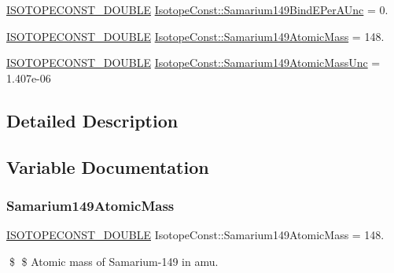 \begin{DoxyCompactItemize}
\mbox{\hyperlink{group___isotope_const-_macros_ga8f45a7272ce02c0b4c65c44636ed719a}{I\+S\+O\+T\+O\+P\+E\+C\+O\+N\+S\+T\+\_\+\+D\+O\+U\+B\+LE}} \mbox{\hyperlink{group___isotope_const-_samarium-_sm149_gad05e7db72c0aa22b7656a46f5c3a4c55}{Isotope\+Const\+::\+Samarium149\+Bind\+E\+Per\+A\+Unc}} = 0.
\item 
\mbox{\hyperlink{group___isotope_const-_macros_ga8f45a7272ce02c0b4c65c44636ed719a}{I\+S\+O\+T\+O\+P\+E\+C\+O\+N\+S\+T\+\_\+\+D\+O\+U\+B\+LE}} \mbox{\hyperlink{group___isotope_const-_samarium-_sm149_ga99986704bd640b95b2909037a37fbda1}{Isotope\+Const\+::\+Samarium149\+Atomic\+Mass}} = 148.
\item 
\mbox{\hyperlink{group___isotope_const-_macros_ga8f45a7272ce02c0b4c65c44636ed719a}{I\+S\+O\+T\+O\+P\+E\+C\+O\+N\+S\+T\+\_\+\+D\+O\+U\+B\+LE}} \mbox{\hyperlink{group___isotope_const-_samarium-_sm149_gae1782030008ebda231b1c505e85d8521}{Isotope\+Const\+::\+Samarium149\+Atomic\+Mass\+Unc}} = 1.\+407e-\/06
\end{DoxyCompactItemize}


\subsection{Detailed Description}


\subsection{Variable Documentation}
\mbox{\label{group___isotope_const-_samarium-_sm149_ga99986704bd640b95b2909037a37fbda1}} 
\subsubsection{\texorpdfstring{Samarium149\+Atomic\+Mass}{Samarium149AtomicMass}}
{\footnotesize\ttfamily \mbox{\hyperlink{group___isotope_const-_macros_ga8f45a7272ce02c0b4c65c44636ed719a}{I\+S\+O\+T\+O\+P\+E\+C\+O\+N\+S\+T\+\_\+\+D\+O\+U\+B\+LE}} Isotope\+Const\+::\+Samarium149\+Atomic\+Mass = 148.}

\$ \$ Atomic mass of Samarium-\/149 in amu. \mbox{\label{group___isotope_const-_samarium-_sm149_gae1782030008ebda231b1c505e85d8521}} 
